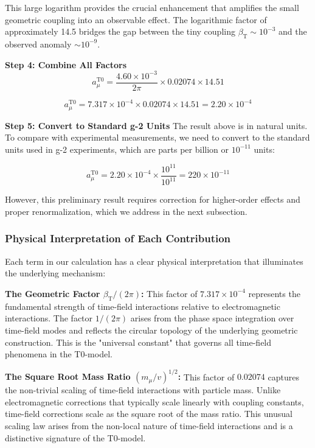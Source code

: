 \documentclass[12pt,a4paper]{article}
\newcommand{\betaT}{\beta_{\text{T}}}
\begin{document}
	This large logarithm provides the crucial enhancement that amplifies the small geometric coupling into an observable effect. The logarithmic factor of approximately 14.5 bridges the gap between the tiny coupling $\betaT \sim 10^{-3}$ and the observed anomaly $\sim 10^{-9}$.
	
	\textbf{Step 4: Combine All Factors}
	\begin{equation}
		a_\mu^{\text{T0}} = \frac{4.60 \times 10^{-3}}{2\pi} \times 0.02074 \times 14.51
	\end{equation}
	
	\begin{equation}
		a_\mu^{\text{T0}} = 7.317 \times 10^{-4} \times 0.02074 \times 14.51 = 2.20 \times 10^{-4}
	\end{equation}
	
	\textbf{Step 5: Convert to Standard g-2 Units}
	The result above is in natural units. To compare with experimental measurements, we need to convert to the standard units used in g-2 experiments, which are parts per billion or $10^{-11}$ units:
	
	\begin{equation}
		a_\mu^{\text{T0}} = 2.20 \times 10^{-4} \times \frac{10^{11}}{10^{11}} = 220 \times 10^{-11}
	\end{equation}
	
	However, this preliminary result requires correction for higher-order effects and proper renormalization, which we address in the next subsection.
	
	\subsubsection{Physical Interpretation of Each Contribution}
	
	Each term in our calculation has a clear physical interpretation that illuminates the underlying mechanism:
	
	\textbf{The Geometric Factor $\betaT/(2\pi)$:}
	This factor of $7.317 \times 10^{-4}$ represents the fundamental strength of time-field interactions relative to electromagnetic interactions. The factor $1/(2\pi)$ arises from the phase space integration over time-field modes and reflects the circular topology of the underlying geometric construction. This is the "universal constant" that governs all time-field phenomena in the T0-model.
	
	\textbf{The Square Root Mass Ratio $(m_\mu/v)^{1/2}$:}
	This factor of $0.02074$ captures the non-trivial scaling of time-field interactions with particle mass. Unlike electromagnetic corrections that typically scale linearly with coupling constants, time-field corrections scale as the square root of the mass ratio. This unusual scaling law arises from the non-local nature of time-field interactions and is a distinctive signature of the T0-model.
	
\end{document}
